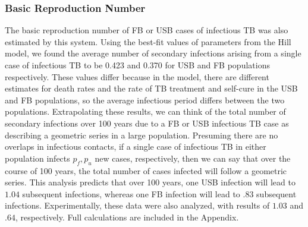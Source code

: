 \documentclass{amsart}
\begin{document}
\subsubsection{Basic Reproduction Number}
The basic reproduction number of FB or USB cases of infectious TB was also
estimated by this system. Using the best-fit values of parameters from the 
Hill model, we found the average number of secondary infections arising from
a single case of infectious TB to be 0.423 and 0.370 for USB and FB populations
respectively.  These values differ because in the model, there are different
estimates for death rates and the rate of TB treatment and self-cure in the USB and FB populations, 
so the average infectious period differs between the two populations.
Extrapolating these results, we can think of the
total number of secondary infections over 100 years due to a FB or USB
infectious TB case as describing a geometric series in a large population.
Presuming there are no overlaps in infectious contacts, if a single case of
infectious TB in either population infects $p_f, p_u$ new cases,
respectively, then we can say that over the course of 100 years, the total
number of cases infected will follow a geometric series. This analysis predicts
that over 100 years, one USB infection will lead to $1.04$ subsequent infections,
whereas one FB infection will lead to $.83$ subsequent infections. Experimentally, 
these data were also analyzed, with results of $1.03$ and $.64$, respectively. 
Full calculations are included in the Appendix.  
\end{document}
